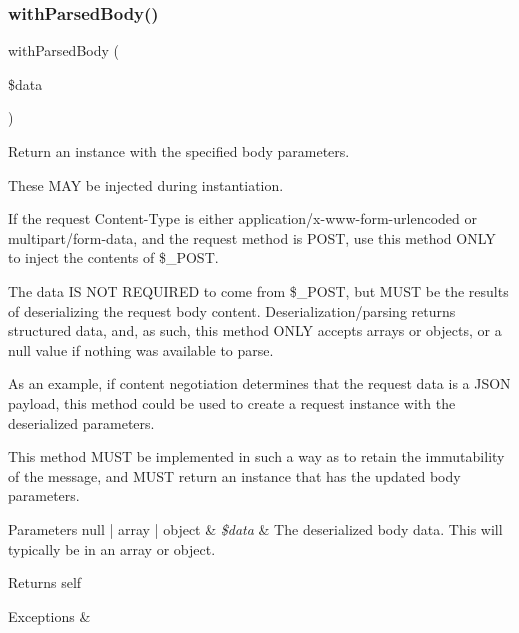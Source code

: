 \subsubsection{\texorpdfstring{with\+Parsed\+Body()}{withParsedBody()}}
{\footnotesize\ttfamily with\+Parsed\+Body (\begin{DoxyParamCaption}\item[{}]{\$data }\end{DoxyParamCaption})}

Return an instance with the specified body parameters.

These M\+AY be injected during instantiation.

If the request Content-\/\+Type is either application/x-\/www-\/form-\/urlencoded or multipart/form-\/data, and the request method is P\+O\+ST, use this method O\+N\+LY to inject the contents of \$\+\_\+\+P\+O\+ST.

The data IS N\+OT R\+E\+Q\+U\+I\+R\+ED to come from \$\+\_\+\+P\+O\+ST, but M\+U\+ST be the results of deserializing the request body content. Deserialization/parsing returns structured data, and, as such, this method O\+N\+LY accepts arrays or objects, or a null value if nothing was available to parse.

As an example, if content negotiation determines that the request data is a J\+S\+ON payload, this method could be used to create a request instance with the deserialized parameters.

This method M\+U\+ST be implemented in such a way as to retain the immutability of the message, and M\+U\+ST return an instance that has the updated body parameters.


\begin{DoxyParams}[1]{Parameters}
null | array | object & {\em \$data} & The deserialized body data. This will typically be in an array or object. \\
\hline
\end{DoxyParams}
\begin{DoxyReturn}{Returns}
self 
\end{DoxyReturn}

\begin{DoxyExceptions}{Exceptions}
{\em } & \\
\hline
\end{DoxyExceptions}
\mbox{\label{class_pes_1_1_http_1_1_request_a2d8091f3537004c1a0241c00f0612cd3}} 
